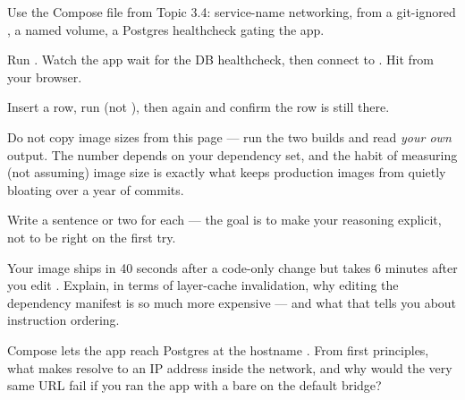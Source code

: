 Use the Compose file from Topic 3.4: service-name networking,  from a git-ignored , a  named volume, a Postgres healthcheck gating the app.

Run . Watch the app wait for the DB healthcheck, then connect to . Hit  from your browser.

Insert a row, run  (not ), then  again and confirm the row is still there.

\begin{prodtip}
Do not copy image sizes from this page --- run the two builds and read \emph{your own}  output. The number depends on your dependency set, and the habit of measuring (not assuming) image size is exactly what keeps production images from quietly bloating over a year of commits.
\end{prodtip}


Write a sentence or two for each --- the goal is to make your reasoning explicit, not to be right on the first try.

\begin{thinkbox}
Your image ships in 40 seconds after a code-only change but takes 6 minutes after you edit . Explain, in terms of layer-cache invalidation, why editing the dependency manifest is so much more expensive --- and what that tells you about instruction ordering.
\end{thinkbox}

\begin{thinkbox}
Compose lets the app reach Postgres at the hostname . From first principles, what makes  resolve to an IP address inside the network, and why would the very same URL fail if you ran the app with a bare  on the default bridge?
\end{thinkbox}

